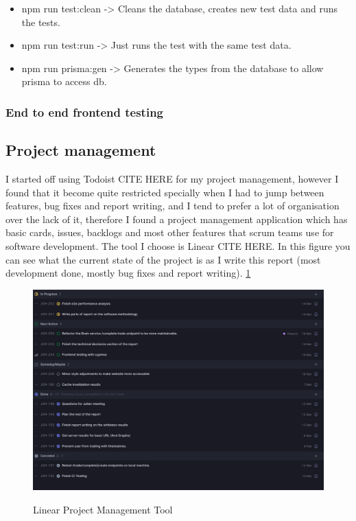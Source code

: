 \documentclass[titlepage]{article}
\begin{document}
\begin{itemize}
  \item npm run test:clean -> Cleans the database, creates new test data and runs the tests.
  \item npm run test:run -> Just runs the test with the same test data.
  \item npm run prisma:gen -> Generates the types from the database to allow prisma to access db.
\end{itemize}

\subsubsection{End to end frontend testing}

\subsection{Project management}
I started off using Todoist CITE HERE for my project management, however I found that it become quite restricted specially when I had to jump between features, bug fixes and report writing, and I tend to prefer a lot of organisation over the lack of it, therefore I found a project management application which has basic cards, issues, backlogs and most other features that scrum teams use for software development. The tool I choose is Linear CITE HERE. In this figure you can see what the current state of the project is as I write this report (most development done, mostly bug fixes and report writing). \ref{linear}

\begin{figure}[h]
  \caption{Linear Project Management Tool}
\hspace*{-3cm}
\includegraphics[width=1.5\textwidth]{../Diagrams/linear.png}
\label{linear}
\end{figure}
\end{document}
